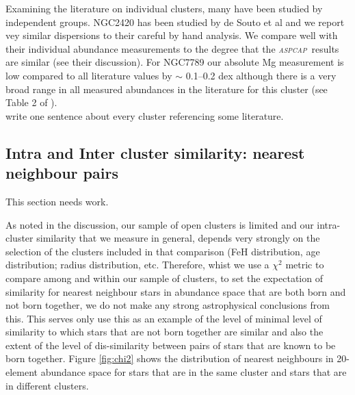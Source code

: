 \documentclass[14pt, preprint2]{aastex6}
\newcommand{\project}[1]{\textsl{#1}}
\newcommand{\tc}{\project{The~Cannon}}
\newcommand{\aspcap}{\project{\textsc{aspcap}}}
\begin{document}
Examining the literature on individual clusters, many have been studied by independent groups. NGC2420 has been studied by de Souto et al and we report vey similar dispersions to their careful by hand analysis. We compare well with their individual abundance measurements to the degree that the \aspcap\
 results are similar (see their discussion). For NGC7789 our absolute Mg measurement is low compared to all literature values by $\sim$ 0.1--0.2 dex although there is a very broad range in all measured abundances in the literature for this cluster (see Table 2 of \citet{Overbeek2015}). \\
 write one sentence about every cluster referencing some literature.\\




\subsection{Intra and Inter cluster similarity: nearest neighbour pairs}

This section needs work. 

As noted in the discussion,  our sample of open clusters is limited and our intra-cluster similarity that we measure in general, depends very strongly on  the selection of the clusters included in that comparison (FeH distribution, age distribution; radius distribution, etc. Therefore, whist we use a $\chi^2$ metric to compare among and within our sample of clusters, to set the expectation of similarity for nearest neighbour stars in abundance space that are both born and not born together, we do not make any  strong astrophysical conclusions from this. This serves  only use this as an example of the level of minimal level of similarity to which stars that are not born together are similar and also the extent of the level of dis-similarity between pairs of stars that are known to be born together.  Figure \ref{fig:chi2} shows the distribution of nearest neighbours in 20-element abundance space for stars that are in the same cluster and stars that are in different clusters. 
\end{document}
